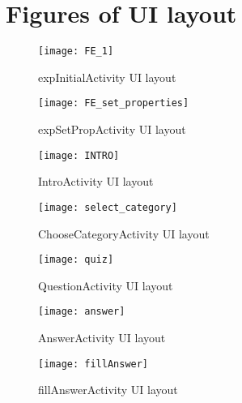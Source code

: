 

  \chapter{Figures of UI layout}

  \begin{figure*}
  \centering
  \begin{minipage}[b]{.4\textwidth}
  \texttt{[image: FE\_1]}
  \caption{expInitialActivity UI layout}
  \label{fig:expInitialActivity}
  \end{minipage}\qquad
  \begin{minipage}[b]{.4\textwidth}
  \texttt{[image: FE\_set\_properties]}
  \caption{expSetPropActivity UI layout}
  \label{fig:expSetPropActivity}
  \end{minipage}
  \end{figure*}

  \begin{figure*}
  \centering
  \begin{minipage}[b]{.4\textwidth}
    \texttt{[image: INTRO]}
    \caption{IntroActivity UI layout}
    \label{fig:IntroActivity}
  \end{minipage}\qquad
  \begin{minipage}[b]{.4\textwidth}
    \texttt{[image: select\_category]}
    \caption{ChooseCategoryActivity UI layout}
    \label{fig:ChooseCategoryActivity}
  \end{minipage}
  \end{figure*}

  \begin{figure*}
  \centering
  \begin{minipage}[b]{.4\textwidth}
    \texttt{[image: quiz]}
    \caption{QuestionActivity UI layout}
    \label{fig:QuestionActivity}
    \end{minipage}\qquad
    \begin{minipage}[b]{.4\textwidth}
      \texttt{[image: answer]}
      \caption{AnswerActivity UI layout}
      \label{fig:AnswerActivity}
    \end{minipage}
  \end{figure*}

  \begin{figure*}
  \centering
  \begin{minipage}[b]{.4\textwidth}
    \texttt{[image: fillAnswer]}
    \caption{fillAnswerActivity UI layout}
    \label{fig:fillAnswerActivity}
  \end{minipage}
  \end{figure*}


